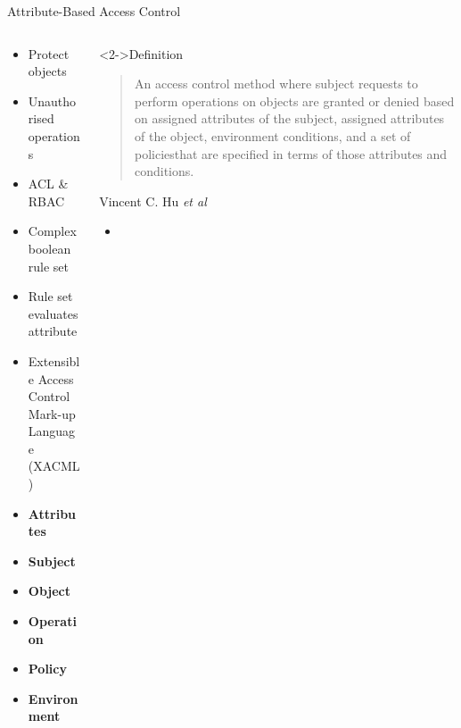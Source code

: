 \documentclass[pdf,table]{beamer}
\begin{document}
\begin{frame}{Attribute-Based Access Control}
	\begin{columns}[T]
		\begin{column}{0.48\textwidth}
			\begin{itemize}
				\item Protect objects
				\item Unauthorised operations
				\item ACL \& RBAC %
				\item Complex boolean rule set
				\item Rule set evaluates attribute
				\item Extensible Access Control Mark-up Language (XACML)
				\item<3-> \textbf{Attributes}
				\item<3-> \textbf{Subject}
				\item<3-> \textbf{Object}
				\item<3-> \textbf{Operation}
				\item<3-> \textbf{Policy}
				\item<3-> \textbf{Environment}
			\end{itemize}
		\end{column}
		\begin{column}{0.48\textwidth}
			\begin{block}<2->{Definition}
				\begin{quote}
				An access control method where subject requests to perform operations on objects are granted or denied based on assigned attributes of the subject, assigned attributes of the object, environment conditions, and a set of policiesthat are specified in terms of those attributes and conditions.
			\end{quote}
				Vincent C. Hu \textit{et al} \cite{huABAC}
			\end{block}
			\begin{itemize}
				\item 
			\end{itemize}
		\end{column}
	\end{columns}	
\end{frame}
\end{document}
